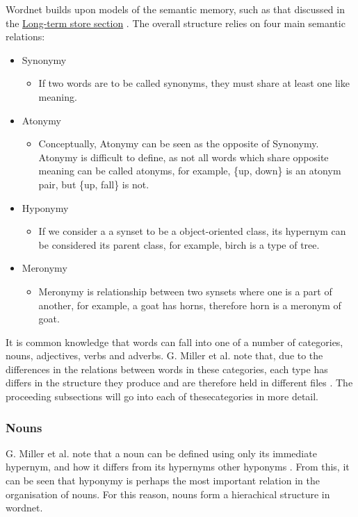 \documentclass[]{article}
\begin{document}
Wordnet builds upon models of the semantic memory, such as that discussed in the \hyperref[LongTerm]{Long-term store section} \cite{WN1Introduction}. The overall structure relies on four main semantic relations:

\begin{itemize}
	\item Synonymy
	\begin{itemize}
		\item If two words are to be called synonyms, they must share at least one like meaning.
	\end{itemize}
	
	\item Atonymy \label{Atonym}
	\begin{itemize}
		\item Conceptually, Atonymy can be seen as the opposite of Synonymy. Atonymy is difficult to define, as not all words which share opposite meaning can be called atonyms, for example, \{up, down\} is an atonym pair, but \{up, fall\} is not.
	\end{itemize}
	
	\item Hyponymy \label{Hypernym}
	\begin{itemize}
		\item If we consider a a synset to be a object-oriented class, its hypernym can be considered its parent class, for example, birch is a type of tree.
	\end{itemize}
	
	\item Meronymy \label{Meronym}
	\begin{itemize}
		\item Meronymy is relationship between two synsets where one is a part of another, for example, a goat has horns, therefore horn is a meronym of goat.
	\end{itemize}
	
\end{itemize}

It is common knowledge that words can fall into one of a number of categories, nouns, adjectives, verbs and adverbs. G. Miller et al. note that, due to the differences in the relations between words in these categories, each type has differs in the structure they produce and are therefore held in different files \cite{WN1Introduction}. The proceeding subsections will go into each of thesecategories in more detail.

\subsubsection{Nouns}
\label{Nouns}
G. Miller et al. note that a noun can be defined using only its immediate hypernym, and how it differs from its hypernyms other hyponyms \cite{WN2Nouns}. From this, it can be seen that hyponymy is perhaps the most important relation in the organisation of nouns. For this reason, nouns form a hierachical structure in wordnet.
\end{document}
